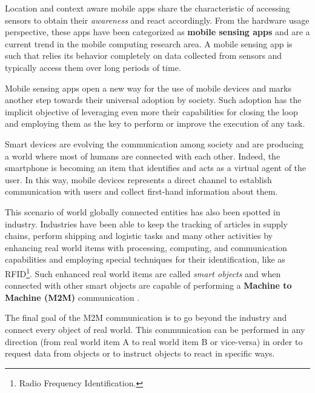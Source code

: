 \documentclass{report}
\begin{document}
Location and context aware mobile apps share the characteristic of accessing sensors to obtain their \emph{awareness} and react accordingly.
From the hardware usage perspective, these apps have been categorized as \textbf{mobile sensing apps} and are a current trend in the mobile computing research area.
A mobile sensing app is such that relies its behavior completely on data collected from sensors and typically access them over long periods of time.

Mobile sensing apps open a new way for the use of mobile devices and marks another step towards their universal adoption by society.
Such adoption has the implicit objective of leveraging even more their capabilities for closing the loop and employing them as the key to perform or improve the execution of any task.

Smart devices are evolving the communication among society and are producing a world where most of humans are connected with each other.
Indeed, the smartphone is becoming an item that identifies and acts as a virtual agent of the user.
In this way, mobile devices represents a direct channel to establish communication with users and collect first-hand information about them.

This scenario of world globally connected entities has also been spotted in industry.
Industries have been able to keep the tracking of articles in supply chains, perform shipping and logistic tasks and many other activities by enhancing real world items with processing, computing, and communication capabilities and employing special techniques for their identification, like as RFID\footnote{Radio Frequency Identification.}.
Such enhanced real world items are called \emph{smart objects} and when connected with other smart objects are capable of performing a \textbf{Machine to Machine (M2M)} communication \citep{Galetic2011}.

The final goal of the M2M communication is to go beyond the industry and connect every object of real world.
This communication can be performed in any direction (from real world item A to real world item B or vice-versa) in order to request data from objects or to instruct objects to react in specific ways.
\end{document}
